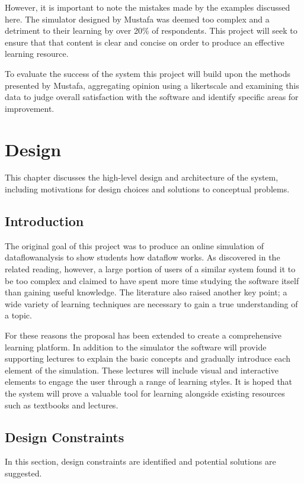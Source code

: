 \documentclass[bsc,twoside,singlespacing,parskip,logo,notimes,normalheadings]{infthesis}
\begin{document}
    However, it is important to note the mistakes made by the examples
    discussed here. The simulator designed by Mustafa was deemed too
    complex\cite[p. 103]{mustafa2010} and a detriment to their
    learning by over 20\% of respondents. This project will seek to
    ensure that that content is clear and concise on order to produce
    an effective learning resource.

    To evaluate the success of the system this project will build upon
    the methods presented by Mustafa, aggregating opinion using a
    \gls{likertscale} and examining this data to judge overall
    satisfaction with the software and identify specific areas for
    improvement.


\chapter{Design}
This chapter discusses the high-level design and architecture of the
system, including motivations for design choices and solutions to
conceptual problems.

    \section{Introduction}
    The original goal of this project was to produce an online
    simulation of \gls{dataflowanalysis} to show students how
    \gls{dataflow} works. As discovered in the related reading,
    however, a large portion of users of a similar system found it to
    be too complex and claimed to have spent more time studying the
    software itself than gaining useful knowledge. The literature also
    raised another key point; a wide variety of learning techniques
    are necessary to gain a true understanding of a topic.

    For these reasons the proposal has been extended to create a
    comprehensive learning platform. In addition to the simulator the
    software will provide supporting lectures to explain the basic
    concepts and gradually introduce each element of the
    simulation. These lectures will include visual and interactive
    elements to engage the user through a range of learning styles. It
    is hoped that the system will prove a valuable tool for learning
    alongside existing resources such as textbooks and lectures.

    \section{Design Constraints}
    In this section, design constraints are identified and potential
    solutions are suggested.
\end{document}
